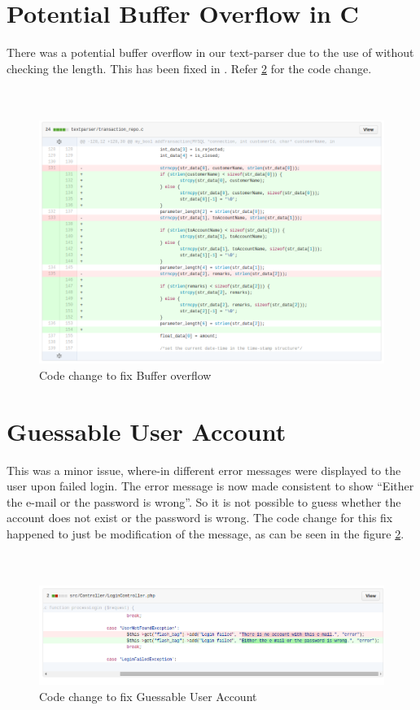 \clearpage

\section{Potential Buffer Overflow in C}
There was a potential buffer overflow in our text-parser due to the use of  without checking the length. This has been fixed in . Refer \ref{} for the code change. \\ \\ \\

\begin{figure}[ht]
	\centering
	\includegraphics[width=.8\linewidth]{figures/fix_buffer_overflow.png}
	\caption{Code change to fix Buffer overflow}
	\label{fig:fix_buffer_overflow}
\end{figure}

\clearpage

\section{Guessable User Account}
This was a minor issue, where-in different error messages were displayed to the user upon failed login. The error message is now made consistent to show \enquote{Either the e-mail or the password is wrong}. So it is not possible to guess whether the account does not exist or the password is wrong.
The code change for this fix happened to just be modification of the message, as can be seen in the figure \ref{fig:fix_guessable_account}. \\ \\ \\

\begin{figure}[ht]
	\centering
	\includegraphics[width=.8\linewidth]{figures/fix_guessable_account.png}
	\caption{Code change to fix Guessable User Account}
	\label{fig:fix_guessable_account}
\end{figure}


